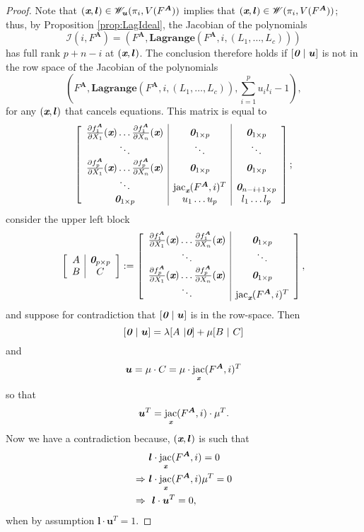 \documentclass[a4paper]{article}
\def\sI{\mathscr{I}}
\def\bz{\textit{\textbf{0}}}
\def\mA{{\bm A}}
\def\ub{{\bm u}}
\def\lb{{\bm l}}
\def\xb{\textit{\textbf{x}}}
\DeclareMathOperator{\jac}{jac}
\def\pa{\partial}
\def\lagFA{{\bm{Lagrange}}(F^{\mA},i,(L_1,\hdots,L_c))}
\def\udl{\sum_{i=1}^pu_il_i}
\begin{document}
    \begin{proof}
    Note that $(\xb,\lb)\in\mathscr{W}_{\ub}(\pi_i,V(F^{\mA}))$ implies that $(\xb,\lb)\in\mathscr{W}(\pi_i,V(F^{\mA}))$; thus, by Proposition \ref{prop:LagIdeal}, the Jacobian of the polynomials \[\sI(i,F^{\mA}) = (F^{\mA},\lagFA)\] has full rank $p+n-i$ at $(\xb,\lb)$. The conclusion therefore holds if $[\bz~|~\ub]$ is not in the row space of the Jacobian of the polynomials
    \[
    \left(F^{\mA},\lagFA,\udl -1\right),
    \]
    for any $(\xb,\bm l)$ that cancels equations. This matrix is equal to
    \[
    \left[ 
    \begin{array}{c|c|c}
    \frac{\pa f_1^{\mA}}{\pa X_1}(\xb) \hdots \frac{\pa f_1^{\mA}}{\pa X_n}(\xb) & \bz_{1\times p} & \bz_{1\times p}\\
    \ddots & \ddots & \ddots\\
    \frac{\pa f_p^{\mA}}{\pa X_1}(\xb) \hdots \frac{\pa f_p^{\mA}}{\pa X_n}(\xb) & \bz_{1\times p} & \bz_{1\times p}\\
    \ddots &\jac_{\xb}(F^{\mA},i)^T & \bz_{n-i+1\times p}\\
    \bz_{1 \times p} & u_1 \hdots u_p & l_1 \hdots l_p 
    \end{array}
    \right];
    \]
    consider the upper left block
    \[
    \left[ 
    \begin{array}{c|c}
    A & \bz_{p\times p} \\
    B & C 
    \end{array}
    \right]
    :=
    \left[ 
    \begin{array}{c|c}
    \frac{\pa f_1^{\mA}}{\pa X_1}(\xb) \hdots \frac{\pa f_1^{\mA}}{\pa X_n}(\xb) & \bz_{1\times p} \\
    \ddots & \ddots \\
    \frac{\pa f_p^{\mA}}{\pa X_1}(\xb) \hdots \frac{\pa f_p^{\mA}}{\pa X_n}(\xb) & \bz_{1\times p} \\
    \ddots &\jac_{\xb}(F^{\mA},i)^T
    \end{array}
    \right],
    \]
    and suppose for contradiction that $[\bz~|~\ub]$ is in the row-space. Then 
    \[
    [\bz~|~\ub]
    =
    \lambda [A~|\bz] + \mu[B~|~C]
    \]
    and 
    \[
    \ub = \mu \cdot C = \mu \cdot \jac_{\xb} (F^{\mA},i)^T
    \]
    so that 
    \[
    \ub^T = \jac_{\xb} (F^{\mA},i) \cdot \mu^T.
    \]
    Now we have a contradiction because, $(\xb,\lb)$ is such that 
    \begin{align*}
        &\lb \cdot \jac_{\xb} (F^{\mA},i)=0\\
        \Rightarrow
        ~&\lb \cdot \jac_{\xb} (F^{\mA},i) \mu^T= 0\\
        \Rightarrow
        ~&~\lb \cdot \ub^T = 0,
    \end{align*}
    when by assumption $\lb \cdot \ub^T = 1.$ 
    \end{proof}
\end{document}

